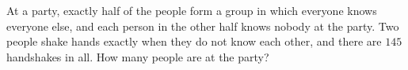 At a party, exactly half of the people form a group in which everyone knows everyone else, and each person in the other half knows nobody at the party. Two people shake hands exactly when they do not know each other, and there are $145$ handshakes in all. How many people are at the party?
